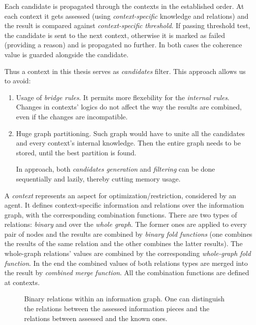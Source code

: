 Each candidate is propagated through the contexts in the established
order. At each context it gets assessed
(using \emph{context-specific} knowledge and relations)
and the result is compared against \emph{context-specific threshold}.
If passing threshold test,
the candidate is sent to the next context, otherwise it is marked as failed
(providing a reason) and is propagated no further. In both cases the coherence
value is guarded alongside the candidate.

Thus a context in this thesis serves as \emph{candidates} filter. This approach
allows us to avoid:
\begin{enumerate}
  \item Usage of \emph{bridge rules}. It permits more flexebility for
    the \emph{internal rules}. Changes in contexts' logics do not affect the way
    the results are combined, even if the changes are incompatible.
  \item Huge graph partitioning. Such graph would have to unite all the
    candidates and every context's internal knowledge. Then the entire graph
    needs to be stored, until the best partition is found.

    In  approach, both \emph{candidates generation} and
    \emph{filtering} can be done sequentially and lazily,
    thereby cutting memory usage.

\end{enumerate}

\medskip

\noindent
A \emph{context} represents an aspect for optimization/restriction, considered
by an agent. It defines context-specific information and relations over the
information graph, with the corresponding combination functions. There are
two types of relations: \emph{binary} and over the \emph{whole graph}. The former ones
are applied to every pair of nodes and the results are combined by
\emph{binary fold functions} (one combines the results of the same relation
and the other combines the latter results). The whole-graph relations' values are
combined by the corresponding \emph{whole-graph fold function}. In the end the
combined values of both relations types are merged into the result by
\emph{combined merge function}. All the combination functions are defined at
contexts.

\begin{figure}[h]
  \centering
  \fbox{  }
  \caption{Binary relations within an information graph. One can
           distinguish the relations between the assessed information pieces
           and the relations between assessed and the known ones.
          }
\end{figure}



